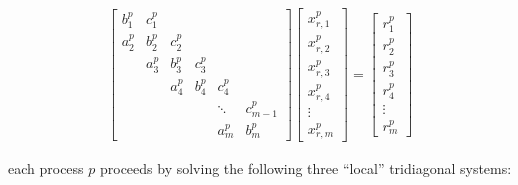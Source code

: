 \begin{align}
& \begin{bmatrix}
b_1^p & c_1^p \\
a_2^p & b_2^p & c_2^p \\
      & a_3^p & b_3^p & c_3^p \\
      &       & a_4^p & b_4^p & c_4^p \\
      &       &       &       &  \ddots & c_{m-1}^p\\
      &       &       &       &     a_{m}^p  & b_{m}^p
\end{bmatrix}
\begin{bmatrix}
x_{r,1}^p \\
x_{r,2}^p \\
x_{r,3}^p \\
x_{r,4}^p \\
\vdots \\
x_{r,m}^p
\end{bmatrix}
=
\begin{bmatrix}
r_1^p \\
r_2^p \\
r_3^p \\
r_4^p \\
\vdots \\
r_m^p
\end{bmatrix} & \label{eqn:global-system} 
\end{align}

each process $p$ proceeds by solving the following three ``local''
tridiagonal systems:

